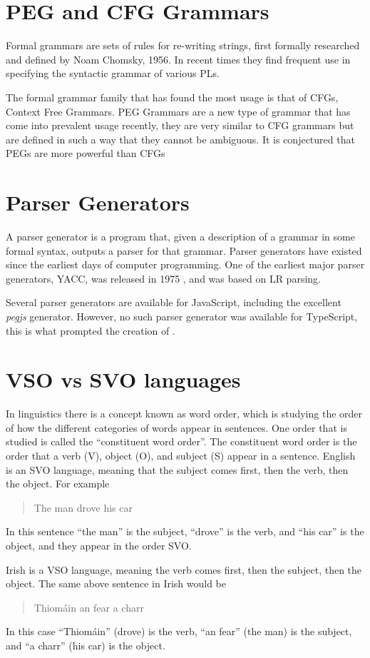 \section{PEG and CFG Grammars}

Formal grammars are sets of rules for re-writing strings, first formally researched and defined by Noam Chomsky, 1956\cite{chomskypaper}. In recent times they find frequent use in specifying the syntactic grammar of various PLs.

The formal grammar family that has found the most usage is that of CFGs, Context Free Grammars. PEG Grammars are a new type of grammar that has come into prevalent usage recently, they are very similar to CFG grammars but are defined in such a way that they cannot be ambiguous. It is conjectured that PEGs are more powerful than CFGs\cite{pegconjecture}

\section{Parser Generators}

A parser generator is a program that, given a description of a grammar in some formal syntax, outputs a parser for that grammar. Parser generators have existed since the earliest days of computer programming. One of the earliest major parser generators, YACC, was released in 1975 \cite{yacc}, and was based on LR parsing.

Several parser generators are available for JavaScript, including the excellent \emph{pegjs} generator. However, no such parser generator was available for TypeScript, this is what prompted the creation of \tsPEG{}.

\section{VSO vs SVO languages}

In linguistics there is a concept known as word order, which is studying the order of how the different categories of words appear in sentences. One order that is studied is called the ``constituent word order''. The constituent word order is the order that a verb (V), object (O), and subject (S) appear in a sentence\cite{wordorder}. English is an SVO language, meaning that the subject comes first, then the verb, then the object. For example
\begin{quote}
    The man drove his car
\end{quote}
In this sentence ``the man'' is the subject, ``drove'' is the verb, and ``his car'' is the object, and they appear in the order SVO.

Irish is a VSO language, meaning the verb comes first, then the subject, then the object. The same above sentence in Irish would be
\begin{quote}
    Thiomáin an fear a charr
\end{quote}
In this case ``Thiomáin'' (drove) is the verb, ``an fear'' (the man) is the subject, and ``a charr'' (his car) is the object.

